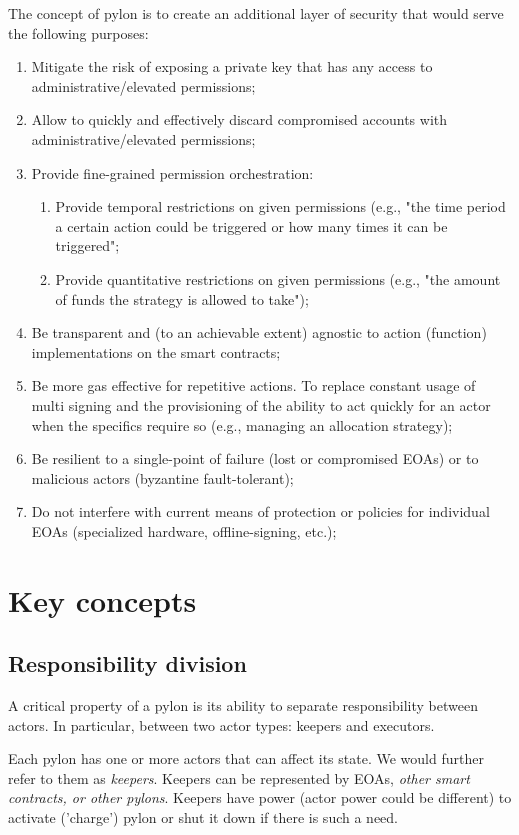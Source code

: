\documentclass[12pt]{article}
\begin{document}
\bigskip
The concept of pylon is to create an additional layer of security that would serve the following purposes:
\begin{enumerate}
\item{Mitigate the risk of exposing a private key that has any access to administrative/elevated permissions;}
\item{Allow to quickly and effectively discard compromised accounts with administrative/elevated permissions;}
\item{Provide fine-grained permission orchestration:
  \begin{enumerate}
	\item{Provide temporal restrictions on given permissions (e.g., "the time period a certain action could be triggered or how many times it can be triggered";}
	\item{Provide quantitative restrictions on given permissions (e.g., "the amount of funds the strategy is allowed to take");}
  \end{enumerate}
}
\item{Be transparent and (to an achievable extent) agnostic to action (function) implementations on the smart contracts;}
\item{Be more gas effective for repetitive actions. To replace constant usage of multi signing and the provisioning of the ability to act quickly for an actor when the specifics require so (e.g., managing an allocation strategy);}
\item{Be resilient to a single-point of failure (lost or compromised EOAs) or to malicious actors (byzantine fault-tolerant);}
\item{Do not interfere with current means of protection or policies for individual EOAs (specialized hardware, offline-signing, etc.);}
\end{enumerate}


\pagebreak
\section{Key concepts}


\subsection{Responsibility division}

A critical property of a pylon is its ability to separate responsibility between actors. In particular, between two actor types: keepers and executors.

Each pylon has one or more actors that can affect its state. We would further refer to them as \emph{keepers}. Keepers can be represented by EOAs, \emph{other smart contracts, or other pylons}. Keepers have power (actor power could be different) to activate ('charge') pylon or shut it down if there is such a need.
\end{document}
